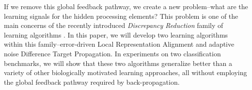 \documentclass[letterpaper]{article} %
\begin{document}
If we remove this global feedback pathway, we create a new problem--what are the learning signals for the hidden processing elements? This problem is one of the main concerns of the recently introduced \emph{Discrepancy Reduction} family of learning algorithms \cite{ororbia2017learning}. 
In this paper, we will develop two learning algorithms within this family--error-driven Local Representation Alignment and adaptive noise Difference Target Propagation. In experiments on two classification benchmarks, we will show that these two algorithms generalize better than a variety of other biologically motivated learning approaches, all without employing the global feedback pathway required by back-propagation.
\end{document}
